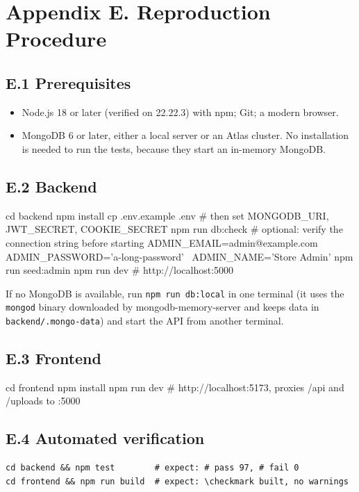 \documentclass[11pt,a4paper]{article}
\begin{document}
\section*{Appendix E. Reproduction Procedure}

\subsection*{E.1 Prerequisites}
\begin{itemize}[leftmargin=1.2em,itemsep=1pt,topsep=2pt]
  \item Node.js 18 or later (verified on 22.22.3) with npm; Git; a modern browser.
  \item MongoDB 6 or later, either a local server or an Atlas cluster. No installation is needed to run the tests, because they start an in-memory MongoDB.
\end{itemize}

\subsection*{E.2 Backend}
\begin{console}
cd backend
npm install
cp .env.example .env          # then set MONGODB_URI, JWT_SECRET, COOKIE_SECRET
npm run db:check              # optional: verify the connection string before starting
ADMIN_EMAIL=admin@example.com ADMIN_PASSWORD='a-long-password' \
  ADMIN_NAME='Store Admin' npm run seed:admin
npm run dev                   # http://localhost:5000
\end{console}

If no MongoDB is available, run \texttt{npm run db:local} in one terminal (it uses the
\texttt{mongod} binary downloaded by mongodb-memory-server and keeps data in
\texttt{backend/.mongo-data}) and start the API from another terminal.

\subsection*{E.3 Frontend}
\begin{console}
cd frontend
npm install
npm run dev                   # http://localhost:5173, proxies /api and /uploads to :5000
\end{console}

\subsection*{E.4 Automated verification}
\begin{Verbatim}[fontsize=\scriptsize,frame=single,framerule=0.4pt,
  rulecolor=\color{gray!45},xleftmargin=2pt,framesep=3pt,samepage,commandchars=\\\{\}]
cd backend && npm test        # expect: # pass 97, # fail 0
cd frontend && npm run build  # expect: \checkmark built, no warnings
\end{Verbatim}
\end{document}
